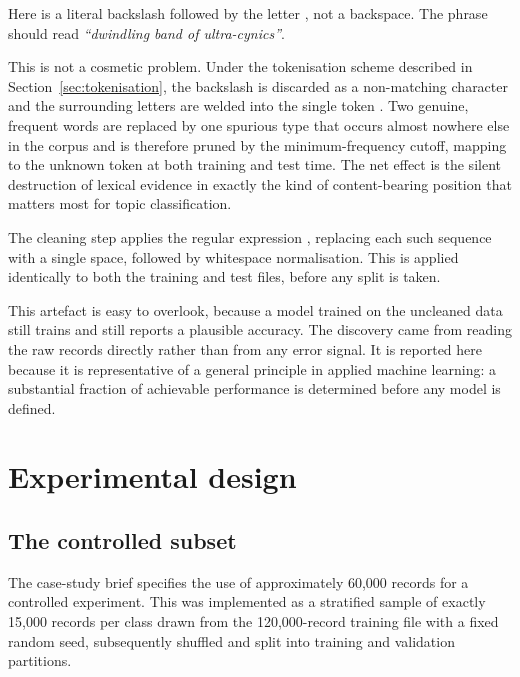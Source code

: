 \begin{quote}
\end{quote}

Here  is a literal backslash followed by the letter , not a
backspace. The phrase should read \emph{``dwindling band of ultra-cynics''}.

This is not a cosmetic problem. Under the tokenisation scheme described in
Section~\ref{sec:tokenisation}, the backslash is discarded as a non-matching character and the
surrounding letters are welded into the single token . Two genuine, frequent
words are replaced by one spurious type that occurs almost nowhere else in the corpus and is
therefore pruned by the minimum-frequency cutoff, mapping to the unknown token at both training and
test time. The net effect is the silent destruction of lexical evidence in exactly the kind of
content-bearing position that matters most for topic classification.

The cleaning step applies the regular expression \code{\bs\bs[a-z]},
replacing each such sequence with a single space, followed by whitespace normalisation. This is
applied identically to both the training and test files, before any split is taken.

 This artefact is easy to overlook, because a model trained on the
uncleaned data still trains and still reports a plausible accuracy. The discovery came from reading
the raw records directly rather than from any error signal. It is reported here because it is
representative of a general principle in applied machine learning: a substantial fraction of
achievable performance is determined before any model is defined.

\section{Experimental design}

\subsection{The controlled subset}

The case-study brief specifies the use of approximately 60{,}000 records for a controlled
experiment. This was implemented as a stratified sample of exactly 15{,}000 records per class drawn
from the 120{,}000-record training file with a fixed random seed, subsequently shuffled and split
into training and validation partitions.

